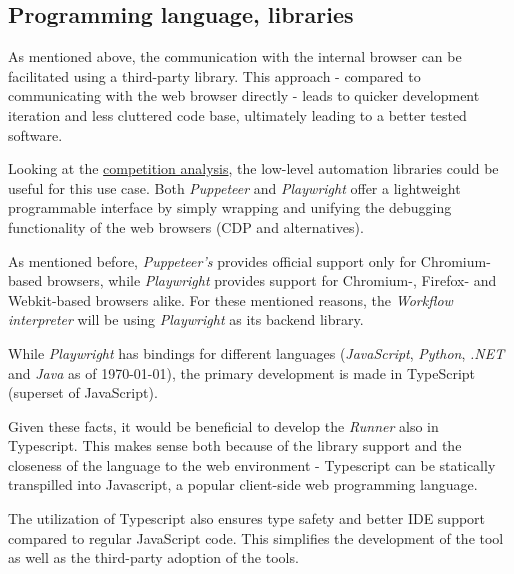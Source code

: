 \subsection{Programming language, libraries}

As mentioned above, the communication with the internal browser can be facilitated using a third-party library. 
This approach - compared to communicating with the web browser directly - leads to quicker development iteration and less cluttered code base, 
ultimately leading to a better tested software. 

Looking at the \hyperref[competition]{competition analysis}, the low-level automation libraries could be useful for this use case.
Both \textit{Puppeteer} and \textit{Playwright} offer a lightweight programmable interface by simply wrapping and unifying 
the debugging functionality of the web browsers (\ac{CDP} and alternatives).

As mentioned before, \textit{Puppeteer's} provides official support only for Chromium-based browsers, while \textit{Playwright} provides support for Chromium-, Firefox- and Webkit-based browsers alike.
For these mentioned reasons, the \textit{Workflow interpreter} will be using \textit{Playwright} as its backend library.

While \textit{Playwright} has bindings for different languages (\textit{JavaScript}, \textit{Python}, \textit{.NET} and \textit{Java} 
as of \today), the primary development is made in TypeScript (superset of JavaScript).

Given these facts, it would be beneficial to develop the \textit{Runner} also in Typescript.
This makes sense both because of the library support and the closeness of the language to the web environment - Typescript can be 
statically transpilled into Javascript, a popular client-side web programming language.

The utilization of Typescript also ensures type safety and better IDE support compared to regular JavaScript code.
This simplifies the development of the tool as well as the third-party adoption of the tools.